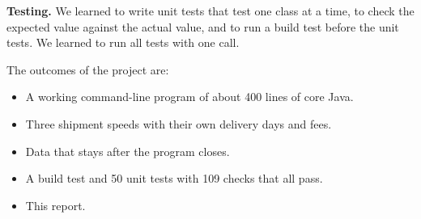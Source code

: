 \textbf{Testing.} We learned to write unit tests that test one class at a
time, to check the expected value against the actual value, and to run a build
test before the unit tests. We learned to run all tests with one call.

The outcomes of the project are:
\begin{itemize}
\item A working command-line program of about 400 lines of core Java.
\item Three shipment speeds with their own delivery days and fees.
\item Data that stays after the program closes.
\item A build test and 50 unit tests with 109 checks that all pass.
\item This report.
\end{itemize}
